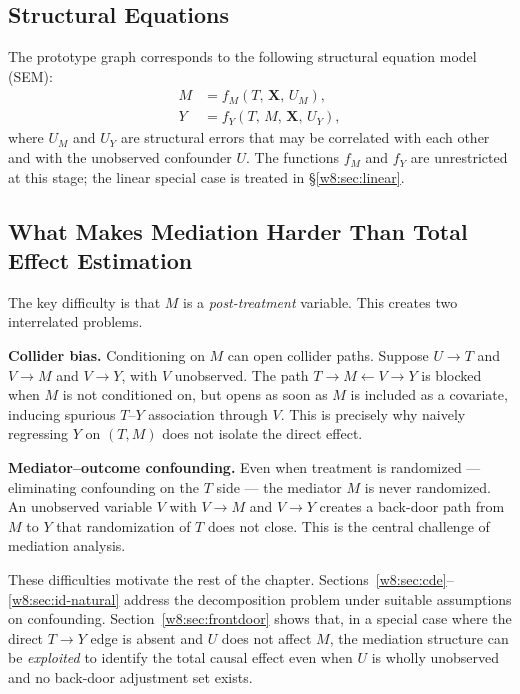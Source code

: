 \documentclass[master.tex]{subfiles}
\begin{document}
\subsection{Structural Equations}

The prototype graph corresponds to the following structural equation
model (SEM):
\begin{align}
  M &= f_M(T,\, \mathbf{X},\, U_M), \label{w8:eq:sem-m} \\
  Y &= f_Y(T,\, M,\, \mathbf{X},\, U_Y), \label{w8:eq:sem-y}
\end{align}
where $U_M$ and $U_Y$ are structural errors that may be correlated with
each other and with the unobserved confounder $U$.  The functions
$f_M$ and $f_Y$ are unrestricted at this stage; the linear special case
is treated in §\ref{w8:sec:linear}.

\subsection{What Makes Mediation Harder Than Total Effect Estimation}

The key difficulty is that $M$ is a \emph{post-treatment} variable.
This creates two interrelated problems.

\medskip\noindent\textbf{Collider bias.}  Conditioning on $M$ can open
collider paths.  Suppose $U \to T$ and $V \to M$ and $V \to Y$, with
$V$ unobserved.  The path $T \to M \leftarrow V \to Y$ is blocked when
$M$ is not conditioned on, but opens as soon as $M$ is included as a
covariate, inducing spurious $T$--$Y$ association through $V$.  This
is precisely why naively regressing $Y$ on $(T, M)$ does not isolate
the direct effect.

\medskip\noindent\textbf{Mediator--outcome confounding.}  Even when
treatment is randomized --- eliminating confounding on the $T$ side ---
the mediator $M$ is never randomized.  An unobserved variable $V$ with
$V \to M$ and $V \to Y$ creates a back-door path from $M$ to $Y$ that
randomization of $T$ does not close.  This is the central challenge of
mediation analysis.

\medskip\noindent These difficulties motivate the rest of the chapter.
Sections~\ref{w8:sec:cde}--\ref{w8:sec:id-natural} address the
decomposition problem under suitable assumptions on confounding.
Section~\ref{w8:sec:frontdoor} shows that, in a special case where the
direct $T \to Y$ edge is absent and $U$ does not affect $M$, the
mediation structure can be \emph{exploited} to identify the total causal
effect even when $U$ is wholly unobserved and no back-door adjustment
set exists.
\end{document}
